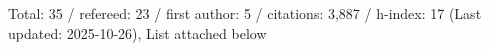 Total: 35 / refereed: 23 / first author: 5 / citations: 3,887 / h-index: 17 (Last updated: 2025-10-26), List attached below